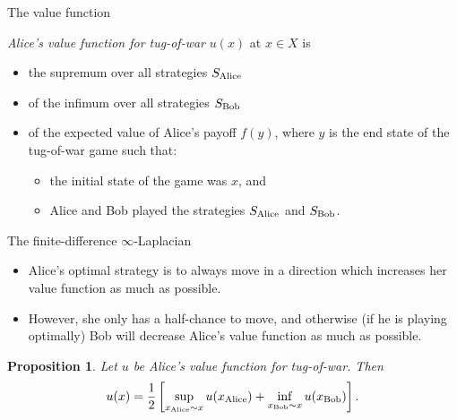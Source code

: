 \documentclass[10pt]{beamer}
\newtheorem{proposition}{Proposition}
\begin{document}
\begin{frame}{The value function}

\begin{definition}
\emph{Alice's value function for tug-of-war} $u(x)$ at $x \in X$ is
\begin{itemize}
\item the supremum over all strategies $S_{\rm Alice}$
\item of the infimum over all strategies $S_{\rm Bob}$
\item of the expected value of Alice's payoff $f(y)$, where $y$ is the end state of the tug-of-war game such that:
\begin{itemize}
\item the initial state of the game was $x$, and
\item Alice and Bob played the strategies $S_{\rm Alice}$ and $S_{\rm Bob}$.
\end{itemize}
\end{itemize}
\end{definition}
\end{frame}

\begin{frame}{The finite-difference $\infty$-Laplacian}
\begin{itemize}
\item Alice's optimal strategy is to always move in a direction which increases her value function as much as possible. \pause 
\item However, she only has a half-chance to move, and otherwise (if he is playing optimally) Bob will decrease Alice's value function as much as possible. \pause
\end{itemize}

\begin{proposition}
Let $u$ be Alice's value function for tug-of-war. Then 
$$u(x) = \frac{1}{2} \left[\sup_{x_{\rm Alice} \sim x} u(x_{\rm Alice}) + \inf_{x_{\rm Bob} \sim x} u(x_{\rm Bob})\right].$$
\end{proposition}  
\end{frame}
\end{document}
